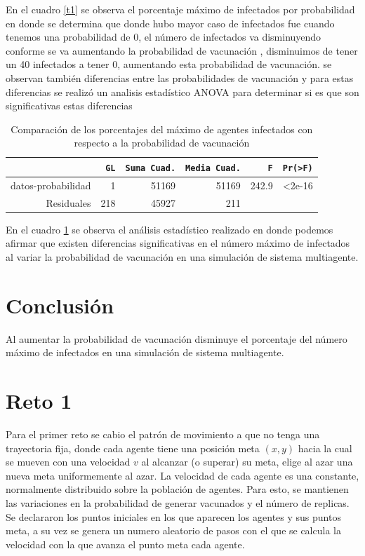 \documentclass{article}
\begin{document}
 En el cuadro \ref{t1} se observa el porcentaje m\'aximo de infectados por probabilidad en donde se determina que donde hubo mayor caso de infectados fue cuando tenemos una probabilidad de 0, el n\'umero de infectados va disminuyendo conforme se va aumentando la probabilidad de vacunaci\'on , disminuimos de tener un 40 infectados a tener 0, aumentando esta probabilidad de vacunaci\'on.
se observan tambi\'en diferencias entre las probabilidades de vacunaci\'on y para  estas diferencias se realiz\'o un analisis estad\'istico ANOVA \citep{clara} para determinar si es que son significativas estas diferencias

\begin{table}[H]
 \caption{Comparaci\'on de los porcentajes del m\'aximo de agentes infectados con respecto a la probabilidad de vacunaci\'on}
 \begin{center}
 \begin{tabular}{r|r|r|r|r|r}
\texttt{} & \texttt{GL} & \texttt{Suma Cuad.} &\texttt{Media Cuad.} & \texttt{F}  & \texttt{Pr(>F)} \\
\hline
datos-probabilidad & 1 & 51169 & 51169 & 242.9 & <2e-16\\ 
\hline
Residuales & 218& 45927 & 211 \\ 
\end{tabular}
\end{center}
\label{t2}
\end{table}

En el cuadro \ref{t2} se observa el an\'alisis estad\'istico realizado en donde podemos afirmar que existen diferencias significativas en el n\'umero m\'aximo de infectados al variar la probabilidad de vacunaci\'on en una simulaci\'on de sistema multiagente.


\section{Conclusi\'{o}n}\label{con}
Al aumentar  la probabilidad de vacunaci\'on disminuye el porcentaje del n\'umero m\'aximo de infectados en una simulaci\'on de sistema multiagente.

\section{Reto 1}\label{ret}

Para el primer reto se cabio el patr\'on de movimiento a que no tenga una trayectoria fija, donde cada agente tiene una posici\'on meta $(x,y)$ hacia la cual se mueven con una velocidad $v$ al alcanzar (o superar) su meta, elige al azar una nueva meta uniformemente al azar. La velocidad de cada agente es una constante, normalmente distribuido sobre la poblaci\'on de agentes. 
Para esto, se mantienen las variaciones en la probabilidad de generar vacunados y el n\'umero de replicas.
Se declararon los puntos iniciales en los que aparecen los agentes y sus puntos meta, a su vez se genera un numero aleatorio de pasos con el que se calcula la velocidad con la que avanza el punto meta cada agente.
\end{document}
